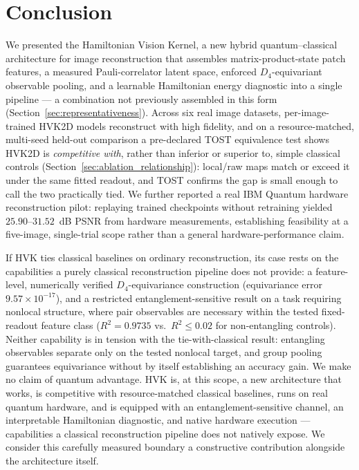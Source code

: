 \documentclass[11pt]{article}
\begin{document}
\section{Conclusion}
\label{sec:conclusion}
We presented the Hamiltonian Vision Kernel, a new hybrid quantum--classical architecture for image reconstruction that assembles matrix-product-state patch features, a measured Pauli-correlator latent space, enforced $D_4$-equivariant observable pooling, and a learnable Hamiltonian energy diagnostic into a single pipeline --- a combination not previously assembled in this form (Section~\ref{sec:representativeness}). Across six real image datasets, per-image-trained HVK2D models reconstruct with high fidelity, and on a resource-matched, multi-seed held-out comparison a pre-declared TOST equivalence test shows HVK2D is \emph{competitive with}, rather than inferior or superior to, simple classical controls (Section~\ref{sec:ablation_relationship}): local/raw maps match or exceed it under the same fitted readout, and TOST confirms the gap is small enough to call the two practically tied. We further reported a real IBM Quantum hardware reconstruction pilot: replaying trained checkpoints without retraining yielded $25.90$--$31.52$~dB PSNR from hardware measurements, establishing feasibility at a five-image, single-trial scope rather than a general hardware-performance claim.

If HVK ties classical baselines on ordinary reconstruction, its case rests on the capabilities a purely classical reconstruction pipeline does not provide: a feature-level, numerically verified $D_4$-equivariance construction (equivariance error $9.57\times10^{-17}$), and a restricted entanglement-sensitive result on a task requiring nonlocal structure, where pair observables are necessary within the tested fixed-readout feature class ($R^2=0.9735$ vs.\ $R^2\leq0.02$ for non-entangling controls). Neither capability is in tension with the tie-with-classical result: entangling observables separate only on the tested nonlocal target, and group pooling guarantees equivariance without by itself establishing an accuracy gain. We make no claim of quantum advantage. HVK is, at this scope, a new architecture that works, is competitive with resource-matched classical baselines, runs on real quantum hardware, and is equipped with an entanglement-sensitive channel, an interpretable Hamiltonian diagnostic, and native hardware execution --- capabilities a classical reconstruction pipeline does not natively expose. We consider this carefully measured boundary a constructive contribution alongside the architecture itself.
\end{document}
